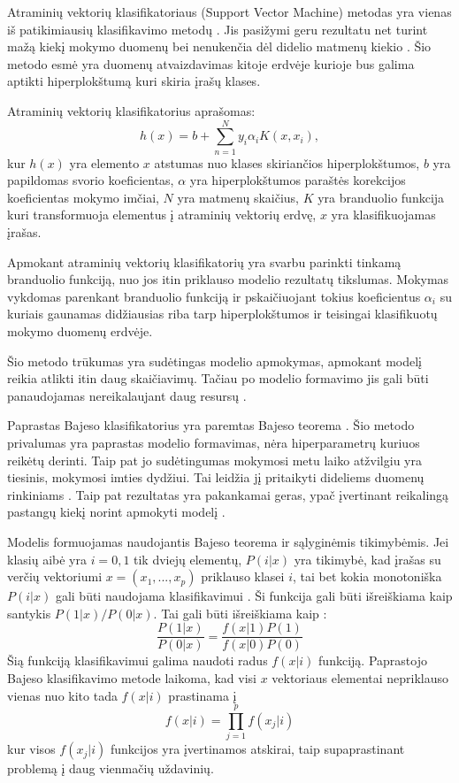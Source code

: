 Atraminių vektorių klasifikatoriaus (Support Vector Machine) metodas yra vienas iš patikimiausių klasifikavimo metodų \cite{Wu2008}. Jis pasižymi geru rezultatu net turint mažą kiekį mokymo duomenų bei nenukenčia dėl didelio matmenų kiekio \cite{Wu2008}. Šio metodo esmė yra duomenų atvaizdavimas kitoje erdvėje kurioje bus galima aptikti hiperplokštumą kuri skiria įrašų klases.

Atraminių vektorių klasifikatorius aprašomas\cite{comp}:
\begin{equation}
    h(x) = b + \sum_{n=1}^{N}y_i \alpha_i K(x, x_i),
\end{equation}
kur $h(x)$ yra elemento $x$ atstumas nuo klases skiriančios hiperplokštumos, $b$ yra papildomas svorio koeficientas, $\alpha$ yra hiperplokštumos paraštės korekcijos koeficientas mokymo imčiai, $N$ yra matmenų skaičius, $K$ yra branduolio funkcija kuri transformuoja elementus į atraminių vektorių erdvę, $x$ yra klasifikuojamas įrašas.

Apmokant atraminių vektorių klasifikatorių yra svarbu parinkti tinkamą branduolio funkciją, nuo jos itin priklauso modelio rezultatų tikslumas. Mokymas vykdomas parenkant branduolio funkciją ir pskaičiuojant tokius koeficientus $\alpha_i$ su kuriais gaunamas didžiausias riba tarp hiperplokštumos ir teisingai klasifikuotų mokymo duomenų erdvėje.

Šio metodo trūkumas yra sudėtingas modelio apmokymas, apmokant modelį reikia atlikti itin daug skaičiavimų. Tačiau po modelio formavimo jis gali būti panaudojamas nereikalaujant daug resursų \cite{Wu2008}.

Paprastas Bajeso klasifikatorius yra paremtas Bajeso teorema \cite{comp}. Šio metodo privalumas yra paprastas modelio formavimas, nėra hiperparametrų kuriuos reikėtų derinti. Taip pat jo sudėtingumas mokymosi metu laiko atžvilgiu yra tiesinis, mokymosi imties dydžiui. Tai leidžia jį pritaikyti dideliems duomenų rinkiniams \cite{Wu2008}. Taip pat rezultatas yra pakankamai geras, ypač įvertinant reikalingą pastangų kiekį norint apmokyti modelį \cite{Wu2008}.

  Modelis formuojamas naudojantis Bajeso teorema ir sąlyginėmis tikimybėmis. Jei klasių aibė yra $i = 0, 1$ tik dviejų elementų, $P(i|x)$ yra tikimybė, kad įrašas su verčių vektoriumi $x = (x_1, ..., x_p)$ priklauso klasei $i$, tai bet kokia monotoniška $P(i|x)$ gali būti naudojama klasifikavimui \cite{Wu2008}. Ši funkcija gali būti išreiškiama kaip santykis $P(1|x)/P(0|x)$. Tai gali būti išreiškiama kaip \cite{Wu2008}:
    \begin{equation}
        \frac{P(1|x)}{P(0|x)} = \frac{f(x|1)P(1)}{f(x|0)P(0)}
    \end{equation}
  Šią funkciją klasifikavimui galima naudoti radus $f(x|i)$ funkciją. Paprastojo Bajeso klasifikavimo metode laikoma, kad visi $x$ vektoriaus elementai nepriklauso vienas nuo kito tada $f(x|i)$ prastinama į \cite{Wu2008}
  \begin{equation}
    f(x|i) = \prod_{j=1}^{p} f(x_j|i)
  \end{equation}
  kur visos $f(x_j|i)$ funkcijos yra įvertinamos atskirai, taip supaprastinant problemą į daug  vienmačių uždavinių.


